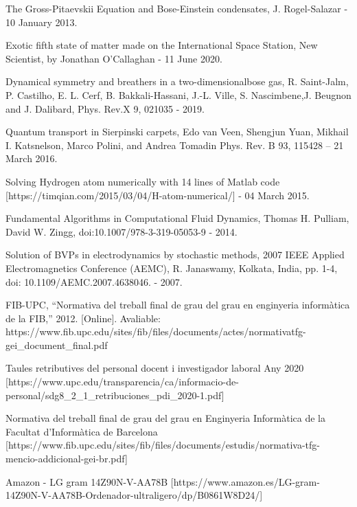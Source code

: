 \documentclass{article}
\begin{document}
\break
{}
\begin{thebibliography}{9}

The Gross-Pitaevskii Equation and Bose-Einstein condensates, J. Rogel-Salazar - 10 January 2013.

Exotic fifth state of matter made on the International Space Station, New Scientist, by Jonathan O’Callaghan - 11 June 2020.

\bibitem{} Dynamical symmetry and breathers in a two-dimensionalbose gas,
R. Saint-Jalm, P. Castilho, E. L. Cerf, B. Bakkali-Hassani, J.-L. Ville, S. Nascimbene,J. Beugnon and J. Dalibard, Phys. Rev.X 9, 021035 - 2019.

\bibitem{} Quantum transport in Sierpinski carpets,
Edo van Veen, Shengjun Yuan, Mikhail I. Katsnelson, Marco Polini, and Andrea Tomadin
Phys. Rev. B 93, 115428 – 21 March 2016.

\bibitem{} Solving Hydrogen atom numerically with 14 lines of Matlab code 
[https://timqian.com/2015/03/04/H-atom-numerical/] - 04 March 2015.

\bibitem{} Fundamental Algorithms in Computational Fluid Dynamics, Thomas H. Pulliam, David W. Zingg, doi:10.1007/978-3-319-05053-9 - 2014.

\bibitem{} Solution of BVPs in electrodynamics by stochastic methods, 2007 IEEE Applied Electromagnetics Conference (AEMC), R. Janaswamy, Kolkata, India, pp. 1-4, doi: 10.1109/AEMC.2007.4638046. - 2007.

FIB-UPC, “Normativa del treball final de grau del grau en enginyeria informàtica de la FIB,” 2012. [Online]. Avaliable:  https://www.fib.upc.edu/sites/fib/files/documents/actes/normativatfg-gei\_document\_final.pdf

Taules retributives del personal docent i investigador laboral Any 2020  [https://www.upc.edu/transparencia/ca/informacio-de-personal/sdg8\_2\_1\_retribuciones\_pdi\_2020-1.pdf]

Normativa del treball final de grau del grau en Enginyeria Informàtica de la Facultat d’Informàtica de Barcelona [https://www.fib.upc.edu/sites/fib/files/documents/estudis/normativa-tfg-mencio-addicional-gei-br.pdf]

Amazon - LG gram 14Z90N-V-AA78B [https://www.amazon.es/LG-gram-14Z90N-V-AA78B-Ordenador-ultraligero/dp/B0861W8D24/]


\end{thebibliography}
\end{document}
